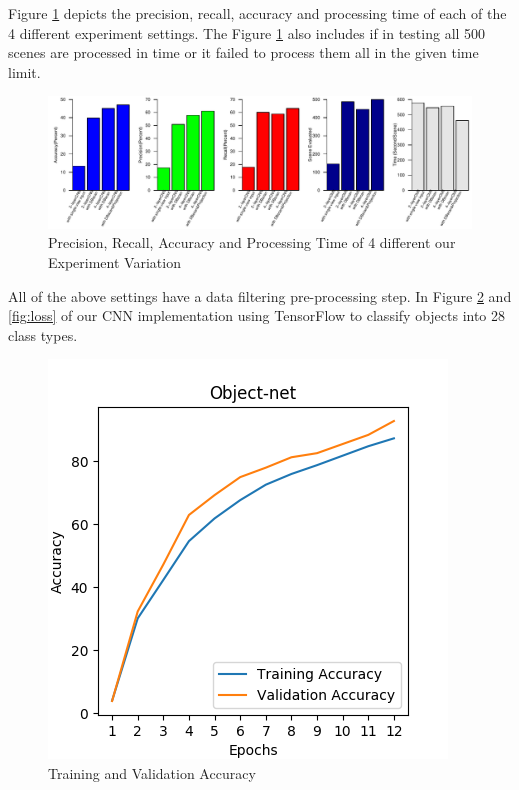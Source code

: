 Figure \ref{fig:evaluation2} depicts the precision, recall, accuracy and processing time of each of the 4 different experiment settings.
The Figure \ref{fig:evaluation2} also includes if in testing all 500 scenes are processed in time
or it failed to process them all in the given time limit.
\begin{figure}[htp]
\begin{center}
  \includegraphics[width=0.8\linewidth]{images/evaluation2.pdf}
  \caption{Precision, Recall, Accuracy and Processing Time of 4 different our Experiment Variation}
  \label{fig:evaluation2}
\end{center}
\end{figure}
All of the above settings have a data filtering pre-processing step. In Figure \ref{fig:accuracy} and \ref{fig:loss} of our CNN implementation 
using TensorFlow to classify objects into 28 class types.
\begin{figure}[htp]
\begin{center}
        \includegraphics[scale=0.5]{images/accuracy.png}
        \caption{Training and Validation Accuracy}
        \label{fig:accuracy}
\end{center}
\end{figure}
